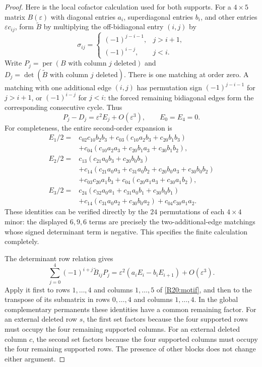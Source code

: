 \begin{proof}
Here is the local cofactor calculation used for both supports.
For a $4\times5$ matrix $B(\varepsilon)$ with diagonal entries
$a_i$, superdiagonal entries $b_i$, and other entries
$\varepsilon c_{ij}$, form $\widetilde B$ by multiplying the
off-bidiagonal entry $(i,j)$ by
\[
 \sigma_{ij}=\begin{cases}
 (-1)^{j-i-1},&j>i+1,\\
 (-1)^{i-j},&j<i.
 \end{cases}
\]
Write $P_j=\operatorname{per}(B\text{ with column }j\text{ deleted})$
and $D_j=\det(\widetilde B\text{ with column }j\text{ deleted})$.
There is one matching at order zero. A matching with one additional
edge $(i,j)$ has permutation sign $(-1)^{j-i-1}$ for $j>i+1$,
or $(-1)^{i-j}$ for $j<i$: the forced remaining bidiagonal edges
form the corresponding consecutive cycle. Thus
\begin{equation}\label{R20:secondorder}
 P_j-D_j=\varepsilon^2 E_j+O(\varepsilon^3),
 \qquad E_0=E_4=0.
\end{equation}
For completeness, the entire second-order expansion is
\begin{align*}
 E_1/2={}&c_{02}c_{10}b_2b_3
 +c_{03}(c_{10}a_2b_3+c_{20}b_1b_3)\\
 &+c_{04}(c_{10}a_2a_3+c_{20}b_1a_3+c_{30}b_1b_2),\\
 E_2/2={}&c_{13}(c_{21}a_0b_3+c_{20}b_0b_3)\\
 &+c_{14}(c_{21}a_0a_3+c_{31}a_0b_2
                   +c_{20}b_0a_3+c_{30}b_0b_2)\\
 &+c_{03}c_{20}a_1b_3
 +c_{04}(c_{20}a_1a_3+c_{30}a_1b_2),\\
 E_3/2={}&c_{24}(c_{32}a_0a_1+c_{31}a_0b_1+c_{30}b_0b_1)\\
 &+c_{14}(c_{31}a_0a_2+c_{30}b_0a_2)
 +c_{04}c_{30}a_1a_2.
\end{align*}
These identities can be verified directly by the $24$ permutations
of each $4\times4$ minor: the displayed $6,9,6$ terms are precisely
the two-additional-edge matchings whose signed determinant term is
negative. This specifies the finite calculation completely.

The determinant row relation gives
\begin{equation}\label{R20:relation}
 \sum_{j=0}^4(-1)^{i+j}\widetilde B_{ij}P_j
 =\varepsilon^2(a_iE_i-b_iE_{i+1})+O(\varepsilon^3).
\end{equation}
Apply it first to rows $1,\ldots,4$ and columns $1,\ldots,5$
of \eqref{R20:motif}, and then to the transpose of its submatrix
in rows $0,\ldots,4$ and columns $1,\ldots,4$.
In the global complementary permanents these identities have a
common remaining factor. For an external deleted row $s$, the
first set factors because the four supported rows must occupy the
four remaining supported columns. For an external deleted column
$c$, the second set factors because the four supported columns
must occupy the four remaining supported rows. The presence of
other blocks does not change either argument.


\end{proof}
